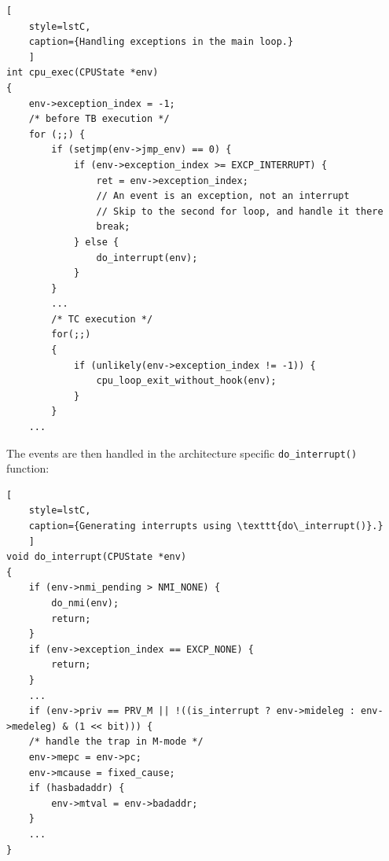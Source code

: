 \pagebreak

\begin{lstlisting}[
    style=lstC,
    caption={Handling exceptions in the main loop.}
    ]
int cpu_exec(CPUState *env)
{
    env->exception_index = -1;
    /* before TB execution */
    for (;;) {
        if (setjmp(env->jmp_env) == 0) {
            if (env->exception_index >= EXCP_INTERRUPT) {
                ret = env->exception_index;
                // An event is an exception, not an interrupt
                // Skip to the second for loop, and handle it there
                break;
            } else {
                do_interrupt(env);
            }
        }
        ...
        /* TC execution */
        for(;;)
        {
            if (unlikely(env->exception_index != -1)) {
                cpu_loop_exit_without_hook(env);
            }
        }
    ...
\end{lstlisting}

\noindent
The events are then handled in the architecture specific \texttt{do\_interrupt()} function:

\begin{lstlisting}[
    style=lstC,
    caption={Generating interrupts using \texttt{do\_interrupt()}.}
    ]
void do_interrupt(CPUState *env)
{
    if (env->nmi_pending > NMI_NONE) {
        do_nmi(env);
        return;
    }
    if (env->exception_index == EXCP_NONE) {
        return;
    }
    ...
    if (env->priv == PRV_M || !((is_interrupt ? env->mideleg : env->medeleg) & (1 << bit))) {
    /* handle the trap in M-mode */
    env->mepc = env->pc;
    env->mcause = fixed_cause;
    if (hasbadaddr) {
        env->mtval = env->badaddr;
    }
    ...
}
\end{lstlisting}
